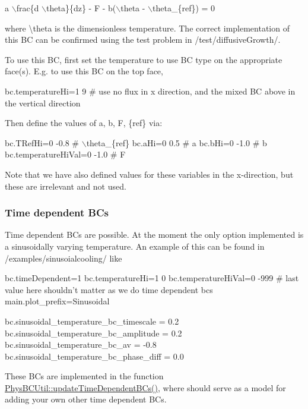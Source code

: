 \begin{DoxyCode}
a \(\backslash\)frac\{d \(\backslash\)theta\}\{dz\} - F - b(\(\backslash\)theta - \(\backslash\)theta\_\{ref\}) = 0
\end{DoxyCode}


where {\ttfamily \textbackslash{}theta} is the dimensionless temperature. The correct implementation of this BC can be confirmed using the test problem in {\ttfamily /test/diffusive\+Growth/}.

To use this BC, first set the temperature to use BC type {} on the appropriate face(s). E.\+g. to use this BC on the top face,


\begin{DoxyCode}
bc.temperatureHi=1 9   # use no flux in x direction, and the mixed BC above in the vertical direction
\end{DoxyCode}


Then define the values of a, b, F, \{ref\} via\+:


\begin{DoxyCode}
bc.TRefHi=0 -0.8  # \(\backslash\)theta\_\{ref\}
bc.aHi=0 0.5  # a
bc.bHi=0 -1.0 # b
bc.temperatureHiVal=0 -1.0 # F
\end{DoxyCode}


Note that we have also defined values for these variables in the x-\/direction, but these are irrelevant and not used.

\subsubsection*{Time dependent B\+Cs}

Time dependent B\+Cs are possible. At the moment the only option implemented is a sinusoidally varying temperature. An example of this can be found in {\ttfamily /examples/sinusoialcooling/} like


\begin{DoxyCode}
bc.timeDependent=1
bc.temperatureHi=1 0
bc.temperatureHiVal=0 -999 # last value here shouldn't matter as we do time dependent bcs
main.plot\_prefix=Sinusoidal

bc.sinusoidal\_temperature\_bc\_timescale = 0.2
bc.sinusoidal\_temperature\_bc\_amplitude = 0.2
bc.sinusoidal\_temperature\_bc\_av = -0.8
bc.sinusoidal\_temperature\_bc\_phase\_diff = 0.0
\end{DoxyCode}


These B\+Cs are implemented in the function {\ttfamily \hyperlink{class_phys_b_c_util_a0caf25dc5c31d42a6f41734c5d9feaff}{Phys\+B\+C\+Util\+::update\+Time\+Dependent\+B\+Cs()}}, where should serve as a model for adding your own other time dependent B\+Cs.

